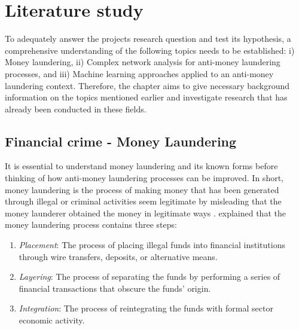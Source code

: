 %
%

%
%


\chapter{Literature study} \label{ch2_heading}


To adequately answer the projects research question and test its hypothesis, a comprehensive understanding of the following topics needs to be established: i) Money laundering, ii) Complex network analysis for anti-money laundering processes, and iii) Machine learning approaches applied to an anti-money laundering context. Therefore, the chapter aims to give necessary background information on the topics mentioned earlier and investigate research that has already been conducted in these fields.        
\section{Financial crime - Money Laundering}

It is essential to understand money laundering and its known forms before thinking of how anti-money laundering processes can be improved. In short, money laundering is the process of making money that has been generated through illegal or criminal activities seem legitimate by misleading that the money launderer obtained the money in legitimate ways \citep*{buchanan2004money}.  \citet*{mcdowell2001senior} explained that the money laundering process contains three steps:

\begin{enumerate}

\item \textit{Placement}:  The process of placing illegal funds into financial institutions through wire transfers, deposits, or alternative means. 

\item \textit{Layering}: The process of separating the funds by performing a series of financial transactions that obscure the funds' origin.    

\item \textit{Integration}: The process of reintegrating the funds with formal sector economic activity. 

\end{enumerate}    

